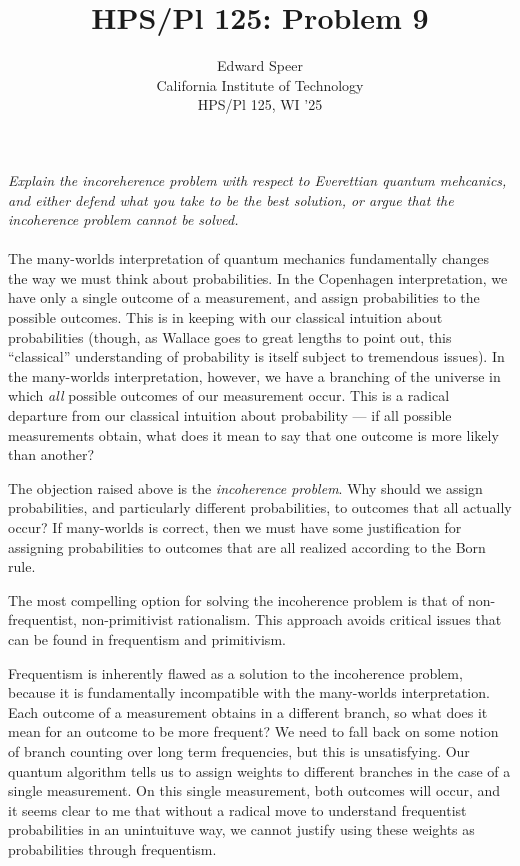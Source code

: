 \documentclass[11pt, a4paper]{article}
\title{HPS/Pl 125: Problem 9}
\author{%
  Edward Speer
  \\
  California Institute of Technology\\
  HPS/Pl 125, WI '25 \\
}
\date{\monthyeardate}
\begin{document}
\maketitle

\noindent \emph{Explain the incoreherence problem with respect to Everettian 
quantum mehcanics, and either defend what you take to be the best solution, or
argue that the incoherence problem cannot be solved.}
\\ \hfill \\
The many-worlds interpretation of quantum mechanics fundamentally changes the
way we must think about probabilities. In the Copenhagen interpretation, we have
only a single outcome of a measurement, and assign probabilities to the possible
outcomes. This is in keeping with our classical intuition about probabilities
(though, as Wallace goes to great lengths to point out, this ``classical'' 
understanding of probability is itself subject to tremendous issues). In the 
many-worlds interpretation, however, we have a branching of the universe in
which \emph{all} possible outcomes of our measurement occur. This is a radical
departure from our classical intuition about probability — if all possible
measurements obtain, what does it mean to say that one outcome is more likely
than another?

The objection raised above is the \emph{incoherence problem}. Why should we
assign probabilities, and particularly different probabilities, to outcomes
that all actually occur? If many-worlds is correct, then we must have some 
justification for assigning probabilities to outcomes that are all realized
according to the Born rule.

The most compelling option for solving the incoherence problem is that of
non-frequentist, non-primitivist rationalism. This approach avoids critical
issues that can be found in frequentism and primitivism. 

Frequentism is inherently flawed as a solution to the incoherence problem,
because it is fundamentally incompatible with the many-worlds interpretation.
Each outcome of a measurement obtains in a different branch, so what does it
mean for an outcome to be more frequent? We need to fall back on some notion of
branch counting over long term frequencies, but this is unsatisfying. Our
quantum algorithm tells us to assign weights to different branches in the case
of a single measurement. On this single measurement, both outcomes will occur, 
and it seems clear to me that without a radical move to understand frequentist
probabilities in an unintuituve way, we cannot justify using these weights as
probabilities through frequentism.
\end{document}
